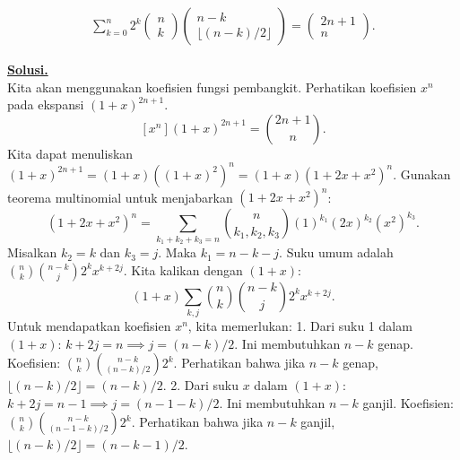 \documentclass[12pt,twoside]{article}
\newenvironment{solution}
{
	\par\noindent\textbf{\underline{Solusi.}}\\
}
{
	\par
}
\begin{document}
\begin{enumerate}
\begin{align*}
          \sum_{k=0}^n 2^k \begin{pmatrix}
                             n \\k
                           \end{pmatrix}\begin{pmatrix}
                                          n-k \\
                                          \lfloor (n-k)/2\rfloor
                                        \end{pmatrix} = \begin{pmatrix}
                                                          2n+1 \\n
                                                        \end{pmatrix}.
        \end{align*}
        \begin{solution}
          Kita akan menggunakan koefisien fungsi pembangkit.
          Perhatikan koefisien $x^n$ pada ekspansi $(1+x)^{2n+1}$.
          \[ [x^n] (1+x)^{2n+1} = \binom{2n+1}{n}. \]
          Kita dapat menuliskan $(1+x)^{2n+1} = (1+x) \left((1+x)^2\right)^n = (1+x)(1+2x+x^2)^n$.
          Gunakan teorema multinomial untuk menjabarkan $(1+2x+x^2)^n$:
          \[ (1+2x+x^2)^n = \sum_{k_1+k_2+k_3=n} \binom{n}{k_1, k_2, k_3} (1)^{k_1} (2x)^{k_2} (x^2)^{k_3}. \]
          Misalkan $k_2 = k$ dan $k_3 = j$. Maka $k_1 = n-k-j$.
          Suku umum adalah $\binom{n}{k} \binom{n-k}{j} 2^k x^{k+2j}$.
          Kita kalikan dengan $(1+x)$:
          \[ (1+x) \sum_{k,j} \binom{n}{k} \binom{n-k}{j} 2^k x^{k+2j}. \]
          Untuk mendapatkan koefisien $x^n$, kita memerlukan:
          1. Dari suku 1 dalam $(1+x)$: $k+2j = n \implies j = (n-k)/2$. Ini membutuhkan $n-k$ genap.
          Koefisien: $\binom{n}{k} \binom{n-k}{(n-k)/2} 2^k$.
          Perhatikan bahwa jika $n-k$ genap, $\lfloor (n-k)/2 \rfloor = (n-k)/2$.
          2. Dari suku $x$ dalam $(1+x)$: $k+2j = n-1 \implies j = (n-1-k)/2$. Ini membutuhkan $n-k$ ganjil.
          Koefisien: $\binom{n}{k} \binom{n-k}{(n-1-k)/2} 2^k$.
          Perhatikan bahwa jika $n-k$ ganjil, $\lfloor (n-k)/2 \rfloor = (n-k-1)/2$.


\end{solution}
\end{enumerate}
\end{document}
